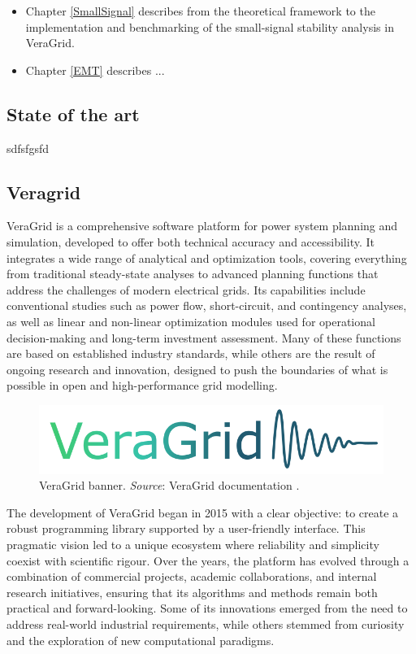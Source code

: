 \begin{itemize}
  \item Chapter \ref{SmallSignal} describes from the theoretical framework to the implementation and benchmarking of the small-signal 
stability analysis in VeraGrid.
  \item Chapter \ref{EMT} describes ...
\end{itemize}

\subsection{State of the art}

sdfsfgsfd

\subsection{Veragrid}

VeraGrid is a comprehensive software platform for power system planning and simulation, developed to offer both technical accuracy and accessibility. 
It integrates a wide range of analytical and optimization tools, covering everything from traditional steady-state analyses to advanced planning functions 
that address the challenges of modern electrical grids. Its capabilities include conventional studies such as power flow, short-circuit, and contingency analyses, 
as well as linear and non-linear optimization modules used for operational decision-making and long-term investment assessment. Many of these functions are based on 
established industry standards, while others are the result of ongoing research and innovation, designed to push the boundaries of what is possible in open and high-performance 
grid modelling.

\begin{figure}[H]
  \centering
  \includegraphics[width=0.8\linewidth]{figures/VeraGrid_banner.png}
  \caption{VeraGrid banner. \textit{Source}: VeraGrid documentation \cite{veragrid}.}
  \label{fig:VeraGrid_banner}
\end{figure}

The development of VeraGrid began in 2015 with a clear objective: to create a robust programming library supported by a user-friendly interface. 
This pragmatic vision led to a unique ecosystem where reliability and simplicity coexist with scientific rigour. Over the years, the platform has evolved through a combination 
of commercial projects, academic collaborations, and internal research initiatives, ensuring that its algorithms and methods remain both practical and forward-looking. 
Some of its innovations emerged from the need to address real-world industrial requirements, while others stemmed from curiosity and the exploration of new computational paradigms.

